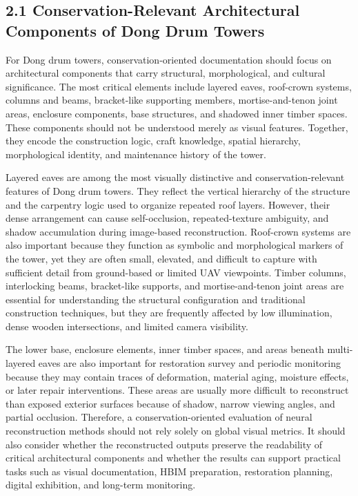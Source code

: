 \subsection{2.1 Conservation-Relevant Architectural Components of Dong
Drum
Towers}\label{conservation-relevant-architectural-components-of-dong-drum-towers}

For Dong drum towers, conservation-oriented documentation should focus
on architectural components that carry structural, morphological, and
cultural significance. The most critical elements include layered eaves,
roof-crown systems, columns and beams, bracket-like supporting members,
mortise-and-tenon joint areas, enclosure components, base structures,
and shadowed inner timber spaces. These components should not be
understood merely as visual features. Together, they encode the
construction logic, craft knowledge, spatial hierarchy, morphological
identity, and maintenance history of the tower.

Layered eaves are among the most visually distinctive and
conservation-relevant features of Dong drum towers. They reflect the
vertical hierarchy of the structure and the carpentry logic used to
organize repeated roof layers. However, their dense arrangement can
cause self-occlusion, repeated-texture ambiguity, and shadow
accumulation during image-based reconstruction. Roof-crown systems are
also important because they function as symbolic and morphological
markers of the tower, yet they are often small, elevated, and difficult
to capture with sufficient detail from ground-based or limited UAV
viewpoints. Timber columns, interlocking beams, bracket-like supports,
and mortise-and-tenon joint areas are essential for understanding the
structural configuration and traditional construction techniques, but
they are frequently affected by low illumination, dense wooden
intersections, and limited camera visibility.

The lower base, enclosure elements, inner timber spaces, and areas
beneath multi-layered eaves are also important for restoration survey
and periodic monitoring because they may contain traces of deformation,
material aging, moisture effects, or later repair interventions. These
areas are usually more difficult to reconstruct than exposed exterior
surfaces because of shadow, narrow viewing angles, and partial
occlusion. Therefore, a conservation-oriented evaluation of neural
reconstruction methods should not rely solely on global visual metrics.
It should also consider whether the reconstructed outputs preserve the
readability of critical architectural components and whether the results
can support practical tasks such as visual documentation, HBIM
preparation, restoration planning, digital exhibition, and long-term
monitoring.

